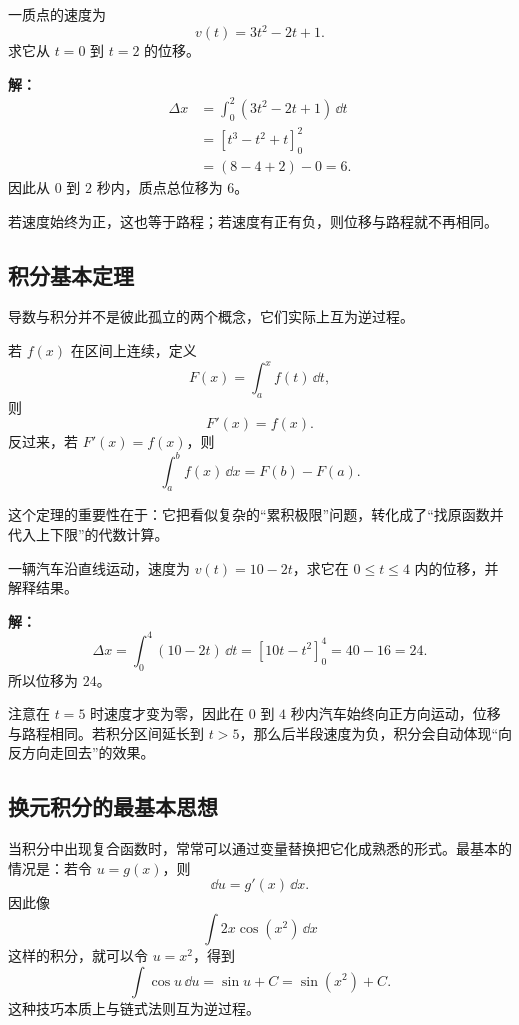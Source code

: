 \begin{example}
一质点的速度为
\[
  v(t)=3t^2-2t+1.
\]
求它从 $t=0$ 到 $t=2$ 的位移。

\textbf{解：}
\begin{align*}
  \Delta x
  &= \int_0^2 (3t^2-2t+1)\,\dd t \\
  &= \left[t^3 - t^2 + t\right]_0^2 \\
  &= (8-4+2)-0 = 6.
\end{align*}
因此从 $0$ 到 $2$ 秒内，质点总位移为 $6$。

若速度始终为正，这也等于路程；若速度有正有负，则位移与路程就不再相同。
\end{example}

\subsection{积分基本定理}

导数与积分并不是彼此孤立的两个概念，它们实际上互为逆过程。

\begin{theorem}[积分基本定理]
若 $f(x)$ 在区间上连续，定义
\[
  F(x)=\int_a^x f(t)\,\dd t,
\]
则
\[
  F'(x)=f(x).
\]
反过来，若 $F'(x)=f(x)$，则
\[
  \int_a^b f(x)\,\dd x = F(b)-F(a).
\]
\end{theorem}

这个定理的重要性在于：它把看似复杂的“累积极限”问题，转化成了“找原函数并代入上下限”的代数计算。

\begin{example}
一辆汽车沿直线运动，速度为 $v(t)=10-2t$，求它在 $0\le t\le 4$ 内的位移，并解释结果。

\textbf{解：}
\[
  \Delta x = \int_0^4 (10-2t)\,\dd t = \left[10t-t^2\right]_0^4 = 40-16 = 24.
\]
所以位移为 $24$。

注意在 $t=5$ 时速度才变为零，因此在 $0$ 到 $4$ 秒内汽车始终向正方向运动，位移与路程相同。若积分区间延长到 $t>5$，那么后半段速度为负，积分会自动体现“向反方向走回去”的效果。
\end{example}

\subsection{换元积分的最基本思想}

当积分中出现复合函数时，常常可以通过变量替换把它化成熟悉的形式。最基本的情况是：若令 $u=g(x)$，则
\[
  \dd u = g'(x)\,\dd x.
\]
因此像
\[
  \int 2x\cos(x^2)\,\dd x
\]
这样的积分，就可以令 $u=x^2$，得到
\[
  \int \cos u\,\dd u = \sin u + C = \sin(x^2)+C.
\]
这种技巧本质上与链式法则互为逆过程。


